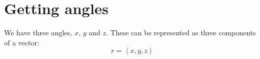 \documentclass{article}
\begin{document}
\section{Getting angles}
We have three angles, \(x\), \(y\) and \(z\). These can be represented as three
components of a vector:
\[ r = \left\langle x, y, z \right\rangle \]
\end{document}

